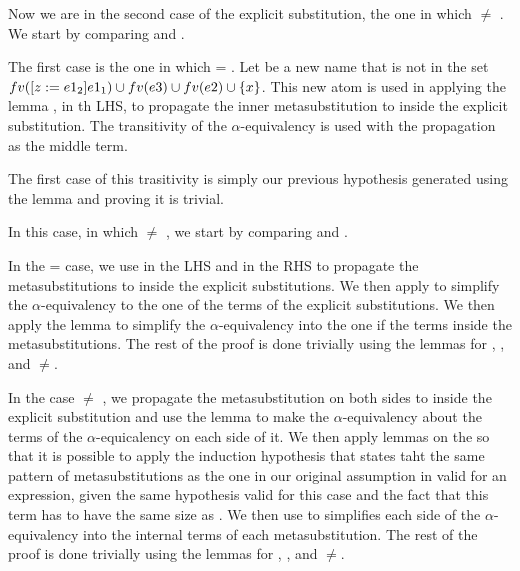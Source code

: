 Now we are in the second case of the explicit substitution, the one in which  \ensuremath{\not=} . We start by comparing  and . 
\begin{coqdoccode}
\end{coqdoccode}
The first case is the one in which  = . Let  be a new name that is not in the set $fv(\esub{e1_1}{z}{e1_2}) \cup fv(e3) \cup fv(e2) \cup \{x\}$. This new atom is used in applying the lemma , in th LHS, to propagate the inner metasubstitution to inside the explicit substitution. The transitivity of the $\alpha$-equivalency is used with the propagation as the middle term.
\begin{coqdoccode}
\end{coqdoccode}
The first case of this trasitivity is simply our previous hypothesis generated using the  lemma and proving it is trivial. 
\begin{coqdoccode}
\end{coqdoccode}
In this case, in which  \ensuremath{\not=} , we start by comparing  and . 
\begin{coqdoccode}
\end{coqdoccode}
In the  =  case, we use  in the LHS and  in the RHS to propagate the metasubstitutions to inside the explicit substitutions. We then apply  to simplify the $\alpha$-equivalency to the one of the terms of the explicit substitutions. We then apply the  lemma to simplify the $\alpha$-equivalency into the one if the terms inside the metasubstitutions. The rest of the proof is done trivially using the lemmas for , ,  and \ensuremath{\not=}.
\begin{coqdoccode}
\end{coqdoccode}
In the case  \ensuremath{\not=} , we propagate the metasubstitution on both sides to inside the explicit substitution and use the  lemma to make the $\alpha$-equivalency about the terms of the $\alpha$-equicalency on each side of it. We then apply lemmas on the  so that it is possible to apply the induction hypothesis that states taht the same pattern of metasubstitutions as the one in our original assumption in valid for an expression, given the same hypothesis valid for this case and the fact that this term has to have the same size as . We then use  to simplifies each side of the $\alpha$-equivalency into the internal terms of each metasubstitution. The rest of the proof is done trivially using the lemmas for , ,  and \ensuremath{\not=}.
